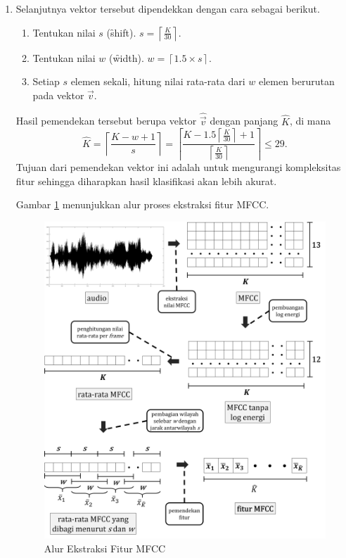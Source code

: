 \begin{enumerate}
	\item Selanjutnya vektor tersebut dipendekkan dengan cara sebagai berikut.
	\begin{enumerate}[label*=\arabic*.]
		\item Tentukan nilai $s$ (\f{shift}). $s = \left\lceil\frac{K}{30}\right\rceil$.
		\item Tentukan nilai $w$ (\f{width}). $w = \left\lceil1.5 \times s\right\rceil$.
		\item Setiap $s$ elemen sekali, hitung nilai rata-rata dari $w$ elemen berurutan pada vektor $\vec{v}$.
	\end{enumerate}
	Hasil pemendekan tersebut berupa vektor $\widehat{\vec{v}}$ dengan panjang $\widehat K$, di mana \[ \widehat{K} = \left\lceil \frac{K-w+1}{s} \right\rceil = \left\lceil \frac{K-1.5\left\lceil\frac{K}{30}\right\rceil+1}{\left\lceil\frac{K}{30}\right\rceil} \right\rceil \leq 29. \] Tujuan dari pemendekan vektor ini adalah untuk mengurangi kompleksitas fitur sehingga diharapkan hasil klasifikasi akan lebih akurat.
  
  Gambar \ref{fig:alurekstraksifiturmfcc} menunjukkan alur proses ekstraksi fitur MFCC.
  \begin{figure}
    \centering
    \includegraphics[width=\linewidth]{pics/ekstraksi_mfcc_v3}
    \caption{Alur Ekstraksi Fitur MFCC}
    \label{fig:alurekstraksifiturmfcc}
  \end{figure}
\end{enumerate}



